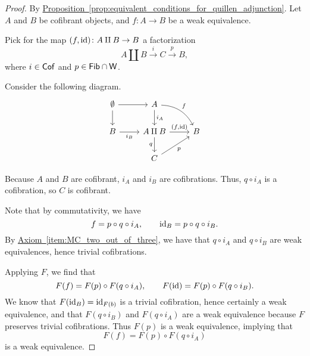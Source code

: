 \documentclass[main.tex]{subfiles}
\begin{document}
\begin{proof}
  By \hyperref[prop:equivalent_conditions_for_quillen_adjunction]{Proposition~\ref*{prop:equivalent_conditions_for_quillen_adjunction}}. Let $A$ and $B$ be cofibrant objects, and $f\colon A \to B$ be a weak equivalence.

  Pick for the map $(f, \mathrm{id})\colon A \amalg B \to B$ a factorization
  \begin{equation*}
    A \amalg B \overset{i}{\to} C \overset{p}{\to} B,
  \end{equation*}
  where $i \in \mathsf{Cof}$ and $p \in \mathsf{Fib} \cap \mathsf{W}$.

  Consider the following diagram.
  \begin{equation*}
    \begin{tikzcd}
      \emptyset
      \arrow[r]
      \arrow[d]
      & A
      \arrow[dr, bend left, "f"]
      \arrow[d, "i_{A}"]
      \\
      B
      \arrow[r, swap, "i_{B}"]
      & A \amalg B
      \arrow[r, "{(f, \id)}"]
      \arrow[d, swap, "q"]
      & B
      \\
      & C
      \arrow[ur, swap, "p"]
    \end{tikzcd}
  \end{equation*}

  Because $A$ and $B$ are cofibrant, $i_{A}$ and $i_{B}$ are cofibrations. Thus, $q \circ i_{A}$ is a cofibration, so $C$ is cofibrant. 
  
  Note that by commutativity, we have
  \begin{equation*}
    f = p \circ q \circ i_{A},\qquad \mathrm{id}_{B} = p \circ q \circ i_{B}.
  \end{equation*}
  By \hyperref[item:MC_two_out_of_three]{Axiom~\ref*{item:MC_two_out_of_three}}, we have that $q \circ i_{A}$ and $q \circ i_{B}$ are weak equivalences, hence trivial cofibrations.

  Applying $F$, we find that
  \begin{equation*}
    F(f) = F(p) \circ F(q \circ i_{A}),\qquad F(\mathrm{id}) = F(p) \circ F(q \circ i_{B}).
  \end{equation*}
  We know that $F(\mathrm{id}_{B}) = \mathrm{id}_{F(b)}$ is a trivial cofibration, hence certainly a weak equivalence, and that $F(q \circ i_{B})$ and $F(q \circ i_{A})$ are a weak equivalence because $F$ preserves trivial cofibrations. Thus $F(p)$ is a weak equivalence, implying that
  \begin{equation*}
    F(f) = F(p) \circ F(q \circ i_{A})
  \end{equation*}
  is a weak equivalence.
\end{proof}
\end{document}
